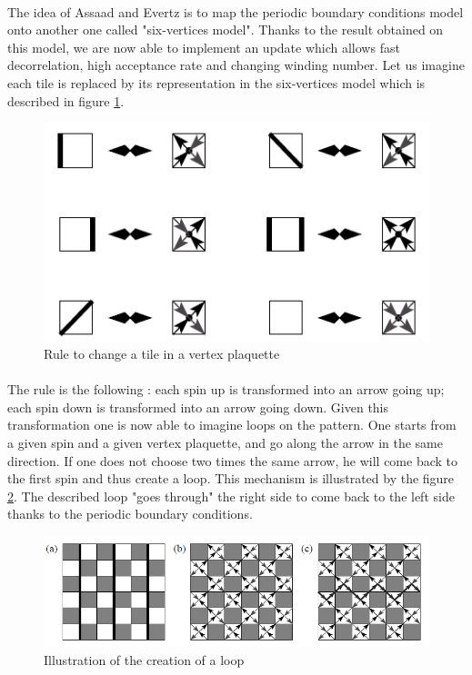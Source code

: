 \documentclass[a4paper,12pt,twoside]{article}
\begin{document}
{	\paragraph{}The idea of Assaad and Evertz is to map the periodic boundary conditions model onto another one called "six-vertices model". Thanks to the result obtained on this model, we are now able to implement an update which allows fast decorrelation, high acceptance rate and changing winding number.
	Let us imagine each tile is replaced by its representation in the six-vertices model which is described in figure \ref{six_vertex}.
	\begin{figure}[!h]
		\centering
		\includegraphics[]{six_vertex.png}
		\caption{Rule to change a tile in a vertex plaquette}
		\label{six_vertex}
	\end{figure}
	\paragraph{} The rule is the following : each spin up is transformed into an arrow going up; each spin down is transformed into an arrow going down. 
	Given this transformation one is now able to imagine loops on the pattern. One starts from a given spin and a given vertex plaquette, and go along the arrow in the same direction. If one does not choose two times the same arrow, he will come back to the first spin and thus create a loop. This mechanism is illustrated by the figure \ref{creating_loop}. The described loop "goes through" the right side to come back to the left side thanks to the periodic boundary conditions.
	\begin{figure}[!h]
		\centering
		\includegraphics[]{creating_loop.png}
		\caption{Illustration of the creation of a loop}
		\label{creating_loop}
	\end{figure}
}
\end{document}
